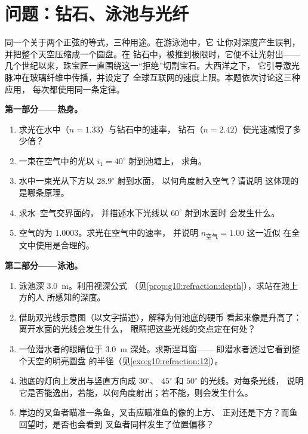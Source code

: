 \section{问题：钻石、泳池与光纤}

\begin{problem}
\label{pb:g10:refraction:1}
同一个关于两个正弦的等式，三种用途。在游泳池中，它
让你对深度产生误判，并把整个天空压缩成一个圆盘。在
钻石中，被推到极限时，它便不让光射出——
几个世纪以来，珠宝匠一直围绕这一“拒绝”切割宝石。大西洋之下，
它引导激光脉冲在玻璃纤维中传播，并设定了
全球互联网的速度上限。本题依次讨论这三种应用，
每次都使用同一条定律。

\medskip
\noindent\textbf{第一部分——热身。}
\begin{enumerate}
  \item 求光在水中（$n = 1.33$）与钻石中的速率，
        钻石（$n = 2.42$）使光速减慢了多少倍？
  \item 一束在空气中的光以 $i_1 = 40^\circ$ 射到池塘上，
        求角。
  \item 水中一束光从下方以 $28.9^\circ$ 射到水面，
        以何角度射入空气？请说明
        这体现的是哪条原理。
  \item 求水–空气交界面的，
        并描述水下光线以 $60^\circ$ 射到水面时
        会发生什么。
  \item 空气的为 $1.0003$。求光在空气中的速率，
        并说明 $n_{\text{空气}} = 1.00$ 这一近似
        在全文中使用是合理的。
\end{enumerate}

\medskip
\noindent\textbf{第二部分——泳池。}
\begin{enumerate}[resume]
  \item 泳池深 \qty{3.0}{m}。利用视深公式
        （见\cref{prop:g10:refraction:depth}），求站在池上方的人
        所感知的深度。
  \item 借助双光线示意图（以文字描述），解释为何池底的硬币
        看起来像是升高了：离开水面的光线会发生什么，
        眼睛把这些光线的交点定在何处？
  \item 一位潜水者的眼睛位于 \qty{3.0}{m} 深处。求斯涅耳窗——
        即潜水者透过它看到整个天空的明亮圆盘
        的半径（见\cref{exo:g10:refraction:12}）。
  \item 池底的灯向上发出与竖直方向成 $30^\circ$、
        $45^\circ$ 和 $50^\circ$ 的光线。对每条光线，
        说明它是否能逸出，若能，以何角度射出；若不能，则会发生什么。
  \item 岸边的叉鱼者瞄准一条鱼，叉击应瞄准鱼的像的上方、
        正对还是下方？而鱼回望时，是否也会看到
        叉鱼者同样发生了位置偏移？
\end{enumerate}


\end{problem}
